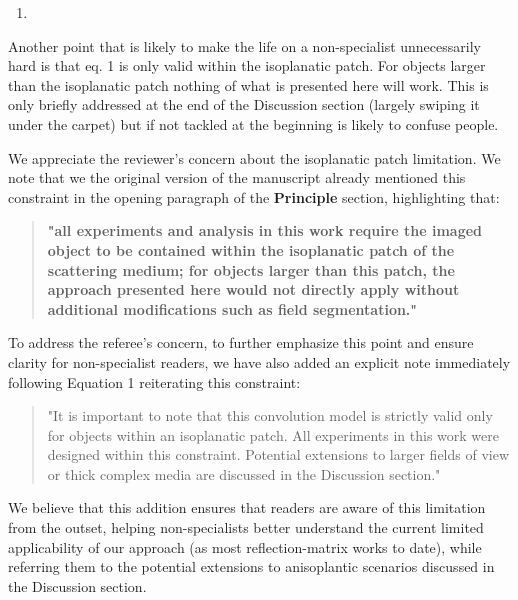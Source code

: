 \documentclass[12pt]{article}
\newenvironment{solved_reviewercomment}
    {\begin{tcolorbox}[width=\linewidth,colback=gray!5,colframe=solved_commentcolor!50,title=Reviewer Comment,left=5pt,right=5pt]}
    {\end{tcolorbox}}
\newenvironment{ourresponse}
    {\begin{tcolorbox}[width=\linewidth,breakable,enhanced,colback=gray!5,colframe=responsecolor!50,title=Response,left=5pt,right=5pt]}
    {\end{tcolorbox}}
\begin{document}
\begin{enumerate}[label=\arabic*., resume]
\item \leavevmode
\end{enumerate}
\vspace{-1em}
\begin{solved_reviewercomment}
    Another point that is likely to make the life on a non-specialist unnecessarily hard is that eq. 1 is only valid within the isoplanatic patch. For objects larger than the isoplanatic patch nothing of what is presented here will work. This is only briefly addressed at the end of the Discussion section (largely swiping it under the carpet) but if not tackled at the beginning is likely to confuse people.
    
\end{solved_reviewercomment}

\begin{ourresponse}
    We appreciate the reviewer's concern about the isoplanatic patch limitation. We note that we the original version of the manuscript already mentioned this constraint in the opening paragraph of the \textbf{Principle} section, highlighting that: 
    \begin{quote}
        \textbf{"all experiments and analysis in this work require the imaged object to be contained within the isoplanatic patch of the scattering medium; for objects larger than this patch, the approach presented here would not directly apply without additional modifications such as field segmentation."}
    \end{quote}

    To address the referee's concern, to further emphasize this point and ensure clarity for non-specialist readers, we have also added an explicit note immediately following Equation 1 reiterating this constraint:
    
    \begin{quote}
        "It is important to note that this convolution model is strictly valid only for objects within an isoplanatic patch. All experiments in this work were designed within this constraint. Potential extensions to larger fields of view or thick complex media are discussed in the Discussion section."
    \end{quote}
    
    We believe that this addition ensures that readers are aware of this limitation from the outset, helping non-specialists better understand the current limited applicability of our approach (as most reflection-matrix works to date), while referring them to the potential extensions to anisoplantic scenarios discussed in the  Discussion section.
\end{ourresponse}
\end{document}
